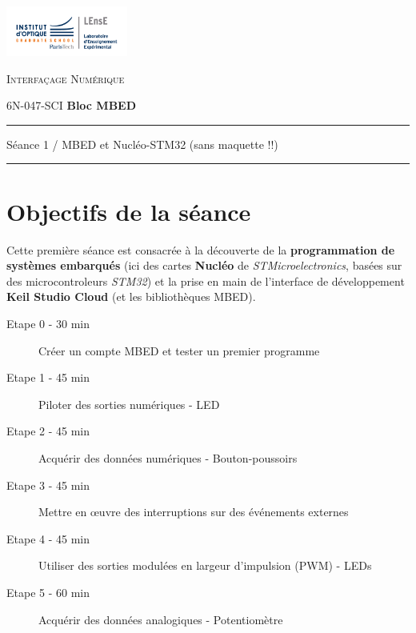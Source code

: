 \documentclass[a4paper,11pt,titlepage]{article} %
\begin{document}
\newpage
\strut %
\newpage
\strut %

\begin{minipage}[c]{.25\linewidth}
	\includegraphics[width=4cm]{images/Logo-LEnsE.png}
\end{minipage} \hfill
\begin{minipage}[c]{.4\linewidth}

\begin{center}
\vspace{0.3cm}
{\Large \textsc{Interfaçage Numérique}}

\medskip

6N-047-SCI \qquad \textbf{\Large Bloc MBED}

\end{center}
\end{minipage}\hfill

\vspace{0.5cm}

\noindent \rule{\linewidth}{1pt}

{\noindent\Large \rule[-7pt]{0pt}{30pt} Séance 1 / MBED et Nucléo-STM32 (sans maquette !!)} 

\noindent \rule{\linewidth}{1pt}


\section{Objectifs de la séance}

Cette première séance est consacrée à la découverte de la \textbf{programmation de systèmes embarqués} (ici des cartes \textbf{Nucléo} de \textit{STMicroelectronics}, basées sur des microcontroleurs \textit{STM32}) et la prise en main de l'interface de développement \textbf{Keil Studio Cloud} (et les bibliothèques MBED).


	\begin{description}
		\item[Etape 0 - 30 min] Créer un compte MBED et tester un premier programme
		\item[Etape 1 - 45 min] Piloter des sorties numériques - LED
		\item[Etape 2 - 45 min] Acquérir des données numériques - Bouton-poussoirs
		\item[Etape 3 - 45 min] Mettre en \oe{}uvre des interruptions sur des événements externes
		\item[Etape 4 - 45 min] Utiliser des sorties modulées en largeur d'impulsion (PWM) - LEDs
		\item[Etape 5 - 60 min] Acquérir des données analogiques - Potentiomètre
	\end{description}	
\end{document}
